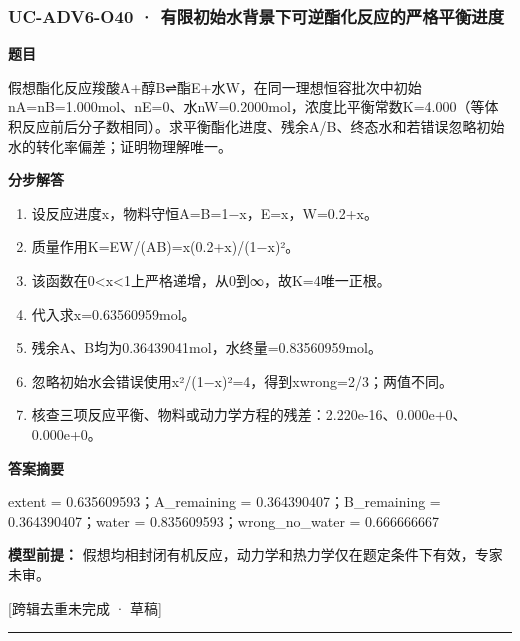\documentclass[UTF8,11pt,a4paper]{ctexart}
\begin{document}
\subsubsection*{UC-ADV6-O40 · 有限初始水背景下可逆酯化反应的严格平衡进度}
\noindent\textbf{题目}\par
假想酯化反应羧酸A+醇B⇌酯E+水W，在同一理想恒容批次中初始nA=nB=1.000mol、nE=0、水nW=0.2000mol，浓度比平衡常数K=4.000（等体积反应前后分子数相同）。求平衡酯化进度、残余A/B、终态水和若错误忽略初始水的转化率偏差；证明物理解唯一。\par
\medskip\noindent\textbf{分步解答}
\begin{enumerate}
\item 设反应进度x，物料守恒A=B=1−x，E=x，W=0.2+x。
\item 质量作用K=EW/(AB)=x(0.2+x)/(1−x)²。
\item 该函数在0<x<1上严格递增，从0到∞，故K=4唯一正根。
\item 代入求x=0.63560959mol。
\item 残余A、B均为0.36439041mol，水终量=0.83560959mol。
\item 忽略初始水会错误使用x²/(1−x)²=4，得到xwrong=2/3；两值不同。
\item 核查三项反应平衡、物料或动力学方程的残差：2.220e-16、0.000e+0、0.000e+0。
\end{enumerate}
\noindent\textbf{答案摘要}\par
extent = 0.635609593；A\_remaining = 0.364390407；B\_remaining = 0.364390407；water = 0.835609593；wrong\_no\_water = 0.666666667\par
\noindent\textbf{模型前提：}
假想均相封闭有机反应，动力学和热力学仅在题定条件下有效，专家未审。\par
\noindent\textcolor{red!65!black}{[跨辑去重未完成 · 草稿]} \par
\medskip\hrule\medskip
{}
\end{document}
